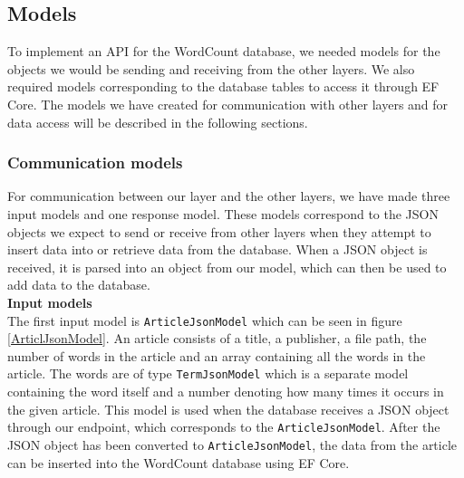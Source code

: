 \subsection{Models}
To implement an API for the WordCount database, we needed models for the objects we would be sending and receiving from the other layers. 
We also required models corresponding to the database tables to access it through EF Core. The models we have created for communication with other layers and for data access will be described in the following sections.

\subsubsection*{Communication models}
For communication between our layer and the other layers, we have made three input models and one response model. 
These models correspond to the JSON objects we expect to send or receive from other layers when they attempt to insert data into or retrieve data from the database. 
When a JSON object is received, it is parsed into an object from our model, which can then be used to add data to the database.
\\

\textbf{Input models}\\
The first input model is \texttt{ArticleJsonModel} which can be seen in figure \ref{ArticlJsonModel}. An article consists of a title, a publisher, a file path, the number of words in the article and an array containing all the words in the article. 
The words are of type \texttt{TermJsonModel} which is a separate model containing the word itself and a number denoting how many times it occurs in the given article.
This model is used when the database receives a JSON object through our endpoint, which corresponds to the \texttt{ArticleJsonModel}. 
After the JSON object has been converted to \texttt{ArticleJsonModel}, the data from the article can be inserted into the WordCount database using EF Core.

